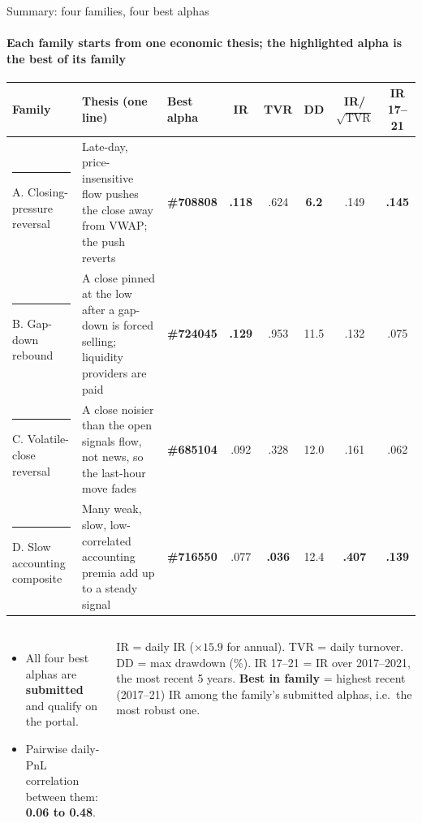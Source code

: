 \documentclass[aspectratio=169,10pt]{beamer}
\newcommand{\famtag}[2]{{\color{#1}\rule[-1pt]{3pt}{9pt}}\hspace{4pt}#2}
\begin{document}
\begin{frame}{Summary: four families, four best alphas}
\framesubtitle{Each family starts from one economic thesis; the highlighted alpha is the best of its family}
\vspace{4pt}
\renewcommand{\arraystretch}{1.35}
\scriptsize
\begin{tabular}{@{}P{2.9cm}P{4.0cm}lccccc@{}}
\toprule
\textbf{Family} & \textbf{Thesis (one line)} & \textbf{Best alpha} & \textbf{IR} & \textbf{TVR} & \textbf{DD} & \textbf{IR/$\sqrt{\text{TVR}}$} & \textbf{IR 17--21}\\
\midrule
\famtag{famA}{A. Closing-pressure reversal} & Late-day, price-insensitive flow pushes the close away from VWAP; the push reverts & \textbf{\#708808} & \textbf{.118} & .624 & \textbf{6.2} & .149 & \textbf{.145}\\
\famtag{famB}{B. Gap-down rebound} & A close pinned at the low after a gap-down is forced selling; liquidity providers are paid & \textbf{\#724045} & \textbf{.129} & .953 & 11.5 & .132 & .075\\
\famtag{famC}{C. Volatile-close reversal} & A close noisier than the open signals flow, not news, so the last-hour move fades & \textbf{\#685104} & .092 & .328 & 12.0 & .161 & .062\\
\famtag{famD}{D. Slow accounting composite} & Many weak, slow, low-correlated accounting premia add up to a steady signal & \textbf{\#716550} & .077 & \textbf{.036} & 12.4 & \textbf{.407} & \textbf{.139}\\
\bottomrule
\end{tabular}

\vspace{8pt}
\begin{columns}[T]
\small
\begin{itemize}
\item All four best alphas are \textbf{submitted} and qualify on the portal.
\item Pairwise daily-PnL correlation between them: \textbf{0.06 to 0.48}.
\end{itemize}
\scriptsize\color{muted}
IR = daily IR (\(\times 15.9\) for annual). TVR = daily turnover. DD = max drawdown (\%).
IR 17--21 = IR over 2017--2021, the most recent 5 years.
\textbf{Best in family} = highest recent (2017--21) IR among the family's submitted alphas, i.e.\ the most robust one.
\end{columns}
\end{frame}
\end{document}
